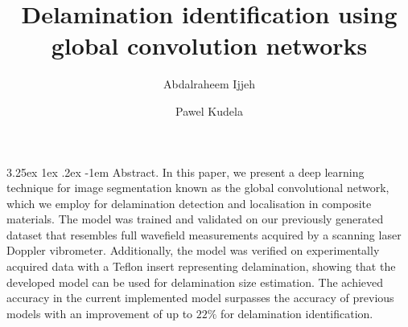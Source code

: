 \documentclass[runningheads]{llncs}
\makeatletter
\renewcommand\paragraph{\@startsection{paragraph}{4}{\z@}%
                                    {3.25ex \@plus1ex \@minus.2ex}%
                                    {-1em}%
                                    {\normalfont\normalsize\bfseries}}
\makeatother
\begin{document}
%
\title{Delamination identification using global convolution networks}
%
%
\author{Abdalraheem Ijjeh \and
Pawel Kudela}
%
%
%
\maketitle              %
%
\paragraph{Abstract.}
In this paper, we present a deep learning technique for image segmentation known as the global convolutional network, which we employ for delamination detection and localisation in composite materials.
The model was trained and validated on our previously generated dataset that resembles full wavefield measurements acquired by a scanning laser Doppler vibrometer.
Additionally, the model was verified on experimentally acquired data with a Teflon insert representing delamination, showing that the developed model can be used for delamination size estimation.
The achieved accuracy in the current implemented model surpasses the accuracy of previous models with an improvement of up to $22\%$ for delamination identification.


%

\end{document}
